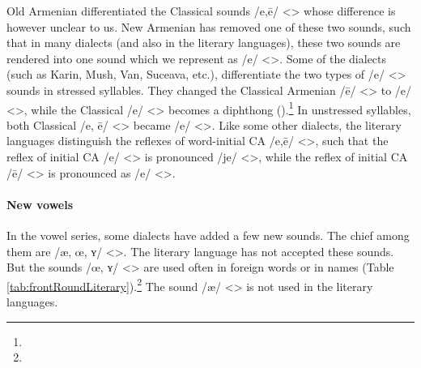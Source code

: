Old Armenian differentiated the Classical sounds /e,ē/ <> whose difference is however unclear to us. New Armenian has removed one of these two sounds, such that in many dialects (and also in the literary languages), these two sounds are rendered into one sound which we represent as /e/ <>. Some of the dialects (such as Karin, Mush, Van, Suceava, etc.), differentiate the two types of /e/ <> sounds in stressed syllables. They changed the Classical Armenian /ē/ <> to /e/ <>, while the Classical /e/ <> becomes a diphthong ().\footnote{} In unstressed syllables, both Classical /e, ē/ <> became /e/ <>. Like some other dialects, the literary languages distinguish the reflexes of word-initial CA /e,ē/ <>, such that the reflex of initial CA /e/ <> is pronounced /je/ <>, while the reflex of initial CA /ē/ <> is pronounced as /e/ <>. 





\begin{adjarianpage}\label{page:16}\end{adjarianpage}%

\paragraph{New vowels}


In the vowel series, some dialects have added a few new sounds. The chief among them are /æ, œ, ʏ/ <>. The literary language has not accepted these sounds. But the sounds /œ, ʏ/ <> are used often in foreign words or in names (Table \ref{tab:frontRoundLiterary}).\footnote{} The sound /æ/ <> is not used in the literary languages.

\begin{table}[H]
	\centering
	\caption{Front round vowels in borrowings in literary Armenian (Standard Western Armenian)}
	\label{tab:frontRoundLiterary}
	\end{table}

